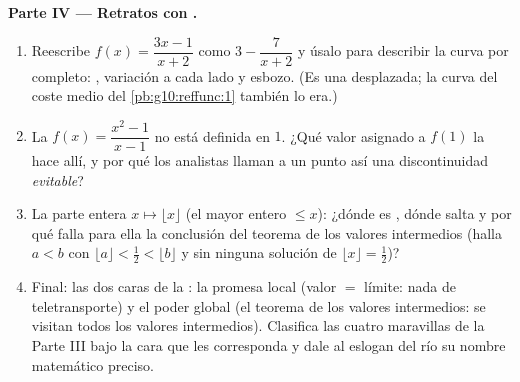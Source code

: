 \begin{problem}
\medskip
\noindent\textbf{Parte IV --- Retratos con .}
\begin{enumerate}[resume]
  \item Reescribe $f(x) = \dfrac{3x - 1}{x + 2}$ como
        $3 - \dfrac{7}{x + 2}$ y úsalo para describir la curva por
        completo: , variación a cada lado y esbozo. (Es una
         desplazada; la curva del coste medio del
        \cref{pb:g10:reffunc:1} también lo era.)
  \item La  $f(x) = \dfrac{x^2 - 1}{x - 1}$ no está definida en $1$.
        ¿Qué valor asignado a $f(1)$ la hace  allí, y por qué los
        analistas llaman a un punto así una discontinuidad
        \emph{evitable}?
  \item La  parte entera $x \mapsto \lfloor x \rfloor$ (el mayor
        entero $\leq x$): ¿dónde es , dónde salta y por qué falla
        para ella la conclusión del teorema de los valores intermedios
        (halla $a < b$ con
        $\lfloor a \rfloor < \frac12 < \lfloor b \rfloor$ y sin ninguna
        solución de $\lfloor x \rfloor = \frac12$)?
  \item Final: las dos caras de la : la promesa local (valor
        $=$ límite: nada de teletransporte) y el poder global (el teorema
        de los valores intermedios: se visitan todos los valores
        intermedios). Clasifica las cuatro maravillas de la Parte III bajo
        la cara que les corresponda y dale al eslogan del río su nombre
        matemático preciso.
\end{enumerate}
\end{problem}
